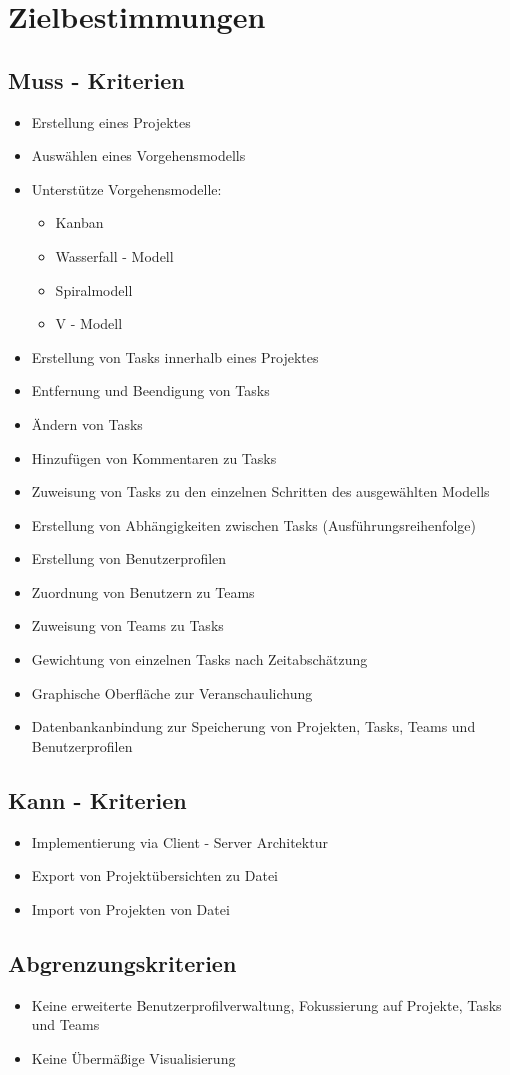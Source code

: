 
\section{Zielbestimmungen}

\subsection{Muss - Kriterien}
\begin{itemize}
	\item Erstellung eines Projektes
	\item Auswählen eines Vorgehensmodells
	\item Unterstütze Vorgehensmodelle:
	\begin{itemize}
		\item Kanban
		\item Wasserfall - Modell
		\item Spiralmodell
		\item V - Modell
	\end{itemize}
	\item Erstellung von Tasks innerhalb eines Projektes
	\item Entfernung und Beendigung von Tasks
	\item Ändern von Tasks
	\item Hinzufügen von Kommentaren zu Tasks
	\item Zuweisung von Tasks zu den einzelnen Schritten des ausgewählten Modells
	\item Erstellung von Abhängigkeiten zwischen Tasks (Ausführungsreihenfolge)
	\item Erstellung von Benutzerprofilen
	\item Zuordnung von Benutzern zu Teams
	\item Zuweisung von Teams zu Tasks
	\item Gewichtung von einzelnen Tasks nach Zeitabschätzung
	\item Graphische Oberfläche zur Veranschaulichung
	\item Datenbankanbindung zur Speicherung von Projekten, Tasks, Teams und Benutzerprofilen
\end{itemize}

\subsection{Kann - Kriterien}
	\begin{itemize}
		\item Implementierung via Client - Server Architektur
		\item Export von Projektübersichten zu Datei
		\item Import von Projekten von Datei
	\end{itemize}

\subsection{Abgrenzungskriterien}
\begin{itemize}
	\item Keine erweiterte Benutzerprofilverwaltung, Fokussierung auf Projekte, Tasks und Teams
	\item Keine Übermäßige Visualisierung
\end{itemize}